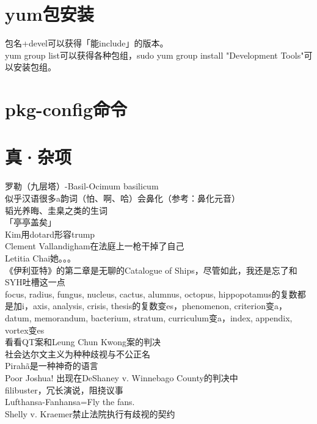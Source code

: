\documentclass{ctexart}
\begin{document}
\section{yum包安装}
\noindent 包名+devel可以获得「能include」的版本。\\
\noindent yum group list可以获得各种包组，sudo yum group install "Development Tools"可以安装包组。
\section{pkg-config命令}
\section*{真·杂项}
\noindent 罗勒（九层塔）-Basil-Ocimum basilicum\\
\noindent 似乎汉语很多a韵词（怕、啊、哈）会鼻化（参考：鼻化元音）\\
\noindent 韬光养晦、圭臬之类的生词\\
\noindent 「亭亭盖矣」\\
\noindent Kim用dotard形容trump\\
\noindent Clement Vallandigham在法庭上一枪干掉了自己\\
\noindent Letitia Chai她。。。\\
\noindent 《伊利亚特》的第二章是无聊的Catalogue of Ships，尽管如此，我还是忘了和SYH吐槽这一点\\
\noindent focus, radius, fungus, nucleus, cactus, alumnus, octopus, hippopotamus的复数都是加i，axis, analysis, crisis, thesis的复数变es，phenomenon, criterion变a，datum, memorandum, bacterium, stratum, curriculum变a，index, appendix, vortex变es\\
\noindent 看看QT案和Leung Chun Kwong案的判决\\
\noindent 社会达尔文主义为种种歧视与不公正名\\
\noindent Pirah\~{a}是一种神奇的语言\\
\noindent Poor Joshua! 出现在DeShaney v. Winnebago County的判决中\\
\noindent filibuster，冗长演说，阻挠议事\\
\noindent Lufthansa-Fanhansa=Fly the fans.\\
\noindent Shelly v. Kraemer禁止法院执行有歧视的契约\\
\\
\end{document}
